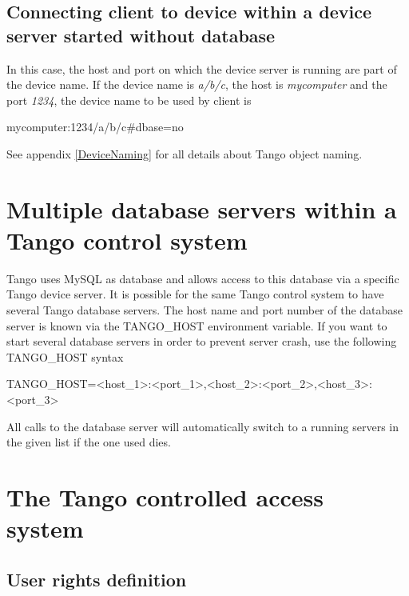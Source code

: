 \subsection{Connecting client to device within a device server started without
database}

In this case, the host and port on which the device server is running
are part of the device name. If the device name is \emph{a/b/c}, the
host is \emph{mycomputer} and the port \emph{1234}, the device name
to be used by client is\begin{center}mycomputer:1234/a/b/c\#dbase=no\end{center}

See appendix \ref{DeviceNaming} for all details about Tango object
naming.

\section{Multiple database servers within a Tango control system}

Tango uses MySQL as database and allows access to this database via
a specific Tango device server. It is possible for the same Tango
control system to have several Tango database servers. The host name
and port number of the database server is known via the TANGO\_HOST
environment variable. If you want to start several database servers
in order to prevent server crash, use the following TANGO\_HOST syntax\begin{center}

TANGO\_HOST=<host\_1>:<port\_1>,<host\_2>:<port\_2>,<host\_3>:<port\_3>\end{center}

All calls to the database server will automatically switch to a running
servers in the given list if the one used dies.

\section{The Tango controlled access system}

\subsection{User rights definition}

